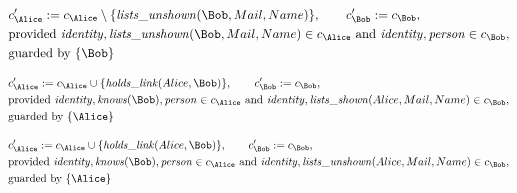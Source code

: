 \begin{align*}
&
c'_
{
\Alice
}
 := 
c_
{
\Alice
}
 \setminus 
\{
\mathit{\detokenize{
lists_unshown
}}
(
\Bob
,
Mail
,
Name
)
\}
, \qquad 
c'_
{
\Bob
}
 := 
c_
{
\Bob
}
,\\
&
\text{provided } 
\mathit{\detokenize{
identity
}}
,
\mathit{\detokenize{
lists_unshown
}}
(
\Bob
,
Mail
,
Name
)
 \in c_
{
\Alice
}
 \text{ and } 
\mathit{\detokenize{
identity
}}
,
\mathit{\detokenize{
person
}}
 \in c_
{
\Bob
}
,\\
&
\text{guarded by } \{
\Bob
\}
\end{align*}

\begin{align*}
&
c'_
{
\Alice
}
 := 
c_
{
\Alice
}
 \cup 
\{
\mathit{\detokenize{
holds_link
}}
(
Alice
,
\Bob
)
\}
, \qquad 
c'_
{
\Bob
}
 := 
c_
{
\Bob
}
,\\
&
\text{provided } 
\mathit{\detokenize{
identity
}}
,
\mathit{\detokenize{
knows
}}
(
\Bob
)
,
\mathit{\detokenize{
person
}}
 \in c_
{
\Alice
}
 \text{ and } 
\mathit{\detokenize{
identity
}}
,
\mathit{\detokenize{
lists_shown
}}
(
Alice
,
Mail
,
Name
)
 \in c_
{
\Bob
}
,\\
&
\text{guarded by } \{
\Alice
\}
\end{align*}

\begin{align*}
&
c'_
{
\Alice
}
 := 
c_
{
\Alice
}
 \cup 
\{
\mathit{\detokenize{
holds_link
}}
(
Alice
,
\Bob
)
\}
, \qquad 
c'_
{
\Bob
}
 := 
c_
{
\Bob
}
,\\
&
\text{provided } 
\mathit{\detokenize{
identity
}}
,
\mathit{\detokenize{
knows
}}
(
\Bob
)
,
\mathit{\detokenize{
person
}}
 \in c_
{
\Alice
}
 \text{ and } 
\mathit{\detokenize{
identity
}}
,
\mathit{\detokenize{
lists_unshown
}}
(
Alice
,
Mail
,
Name
)
 \in c_
{
\Bob
}
,\\
&
\text{guarded by } \{
\Alice
\}
\end{align*}
